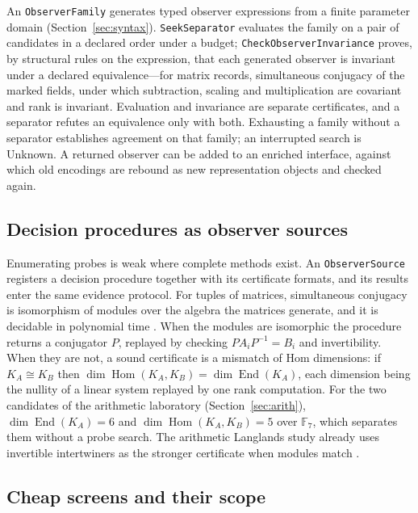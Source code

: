 \documentclass[11pt]{article}
\newcommand{\code}[1]{\texttt{#1}}
\newcommand{\Hom}{\operatorname{Hom}}
\newcommand{\End}{\operatorname{End}}
\newcommand{\F}{\mathbb{F}}
\theoremstyle{definition}
\theoremstyle{plain}
\begin{document}
An \code{ObserverFamily} generates typed observer expressions from a finite parameter domain
(Section~\ref{sec:syntax}). \code{SeekSeparator} evaluates the family on a pair of candidates in a
declared order under a budget; \code{CheckObserverInvariance} proves, by structural rules on the
expression, that each generated observer is invariant under a declared equivalence---for matrix
records, simultaneous conjugacy of the marked fields, under which subtraction, scaling and
multiplication are covariant and rank is invariant. Evaluation and invariance are separate
certificates, and a separator refutes an equivalence only with both. Exhausting a family without a
separator establishes agreement on that family; an interrupted search is Unknown. A returned
observer can be added to an enriched interface, against which old encodings are rebound as new
representation objects and checked again.

\subsection{Decision procedures as observer sources}

Enumerating probes is weak where complete methods exist. An \code{ObserverSource} registers a
decision procedure together with its certificate formats, and its results enter the same evidence
protocol. For tuples of matrices, simultaneous conjugacy is isomorphism of modules over the algebra
the matrices generate, and it is decidable in polynomial time \cite{cik,brooksbankluks}. When the
modules are isomorphic the procedure returns a conjugator $P$, replayed by checking $PA_iP^{-1}=B_i$
and invertibility. When they are not, a sound certificate is a mismatch of Hom dimensions: if
$K_A\cong K_B$ then $\dim\Hom(K_A,K_B)=\dim\End(K_A)$, each dimension being the nullity of a linear
system replayed by one rank computation. For the two candidates of the arithmetic laboratory
(Section~\ref{sec:arith}), $\dim\End(K_A)=6$ and $\dim\Hom(K_A,K_B)=5$ over $\F_7$, which separates
them without a probe search. The arithmetic Langlands study already uses invertible intertwiners as
the stronger certificate when modules match \cite{langlands}.

\subsection{Cheap screens and their scope}\label{sec:screens}
\end{document}
